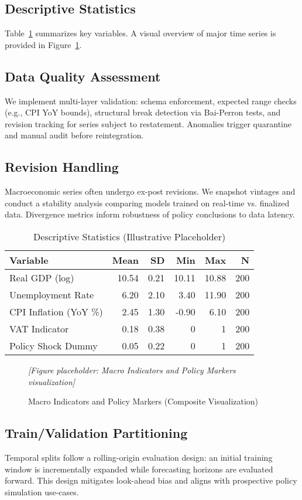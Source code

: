 \subsection{Descriptive Statistics}
Table~\ref{tab:descriptive} summarizes key variables. A visual overview of major time series is provided in Figure~\ref{fig:econ_overview}.

\subsection{Data Quality Assessment}
We implement multi-layer validation: schema enforcement, expected range checks (e.g., CPI YoY bounds), structural break detection via Bai-Perron tests, and revision tracking for series subject to restatement. Anomalies trigger quarantine and manual audit before reintegration.

\subsection{Revision Handling}
Macroeconomic series often undergo ex-post revisions. We snapshot vintages and conduct a stability analysis comparing models trained on real-time vs. finalized data. Divergence metrics inform robustness of policy conclusions to data latency.

\begin{table}[H]
  \centering
  \caption{Descriptive Statistics (Illustrative Placeholder)}\label{tab:descriptive}
  \begin{tabular}{lrrrrr}
    \toprule
    Variable & Mean & SD & Min & Max & N \\
    \midrule
    Real GDP (log) & 10.54 & 0.21 & 10.11 & 10.88 & 200 \\
    Unemployment Rate & 6.20 & 2.10 & 3.40 & 11.90 & 200 \\
    CPI Inflation (YoY \%) & 2.45 & 1.30 & -0.90 & 6.10 & 200 \\
    VAT Indicator & 0.18 & 0.38 & 0 & 1 & 200 \\
    Policy Shock Dummy & 0.05 & 0.22 & 0 & 1 & 200 \\
    \bottomrule
  \end{tabular}
\end{table}

\begin{figure}[H]
  \centering
  \textit{[Figure placeholder: Macro Indicators and Policy Markers visualization]}
  \caption{Macro Indicators and Policy Markers (Composite Visualization)}\label{fig:econ_overview}
\end{figure}

\subsection{Train/Validation Partitioning}
Temporal splits follow a rolling-origin evaluation design: an initial training window is incrementally expanded while forecasting horizons are evaluated forward. This design mitigates look-ahead bias and aligns with prospective policy simulation use-cases.

